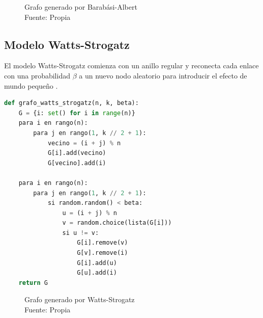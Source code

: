 \begin{figure}[h]
\caption{Grafo generado por Barabási-Albert\\Fuente: Propia}
\end{figure}


\subsection{Modelo Watts-Strogatz}

El modelo Watts-Strogatz comienza con un anillo regular y reconecta cada enlace con una probabilidad \( \beta \) a un nuevo nodo aleatorio para introducir el efecto de mundo pequeño \citep{Watts1998} .

\begin{lstlisting}[language=Python]
def grafo_watts_strogatz(n, k, beta):
    G = {i: set() for i in range(n)}
    para i en rango(n):
        para j en rango(1, k // 2 + 1):
            vecino = (i + j) % n
            G[i].add(vecino)
            G[vecino].add(i)

    para i en rango(n):
        para j en rango(1, k // 2 + 1):
            si random.random() < beta:
                u = (i + j) % n
                v = random.choice(lista(G[i]))
                si u != v:
                    G[i].remove(v)
                    G[v].remove(i)
                    G[i].add(u)
                    G[u].add(i)
    return G
\end{lstlisting}
\begin{figure}[h]
\caption{Grafo generado por Watts-Strogatz\\Fuente: Propia}
\end{figure}

